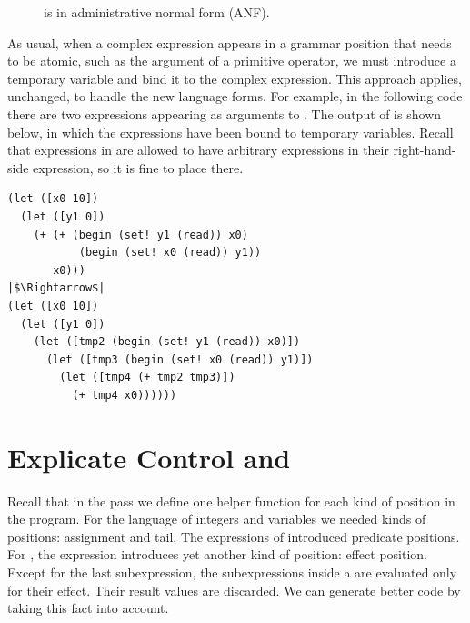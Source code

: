 \documentclass[11pt]{book}
\newcommand{\gray}[1]{{\color{gray} #1}}
\begin{document}
\begin{figure}[tp]
\centering
\fbox{
\begin{minipage}{0.96\textwidth}
\small
\[
\begin{array}{rcl}
\Atm &::=& \gray{ \INT{\Int} \mid \VAR{\Var} \mid \BOOL{\itm{bool}}
       \mid \VOID{} } \\
\Exp &::=& \ldots \mid \gray{ \LET{\Var}{\Exp}{\Exp} } \\
    &\mid& \WHILE{\Exp}{\Exp} \mid \SETBANG{\Var}{\Exp}
   \mid \BEGIN{\LP\Exp\ldots\RP}{\Exp} \\
\Def &::=& \gray{ \FUNDEF{\Var}{([\Var \code{:} \Type]\ldots)}{\Type}{\code{'()}}{\Exp} }\\
R^{\dagger}_8  &::=& \gray{ \PROGRAMDEFS{\code{'()}}{\Def} }
\end{array}
\]
\end{minipage}
}
\caption{\LangLoopANF{} is \LangLoop{} in administrative normal form (ANF).}
\label{fig:Rwhile-anf-syntax}
\end{figure}

As usual, when a complex expression appears in a grammar position that
needs to be atomic, such as the argument of a primitive operator, we
must introduce a temporary variable and bind it to the complex
expression.  This approach applies, unchanged, to handle the new
language forms.  For example, in the following code there are two
 expressions appearing as arguments to \code{+}.  The
output of  is shown below, in which the 
expressions have been bound to temporary variables. Recall that
 expressions in \LangLoopANF{} are allowed to have
arbitrary expressions in their right-hand-side expression, so it is
fine to place  there.

\begin{lstlisting}
(let ([x0 10])
  (let ([y1 0])
    (+ (+ (begin (set! y1 (read)) x0)
           (begin (set! x0 (read)) y1))
       x0)))
|$\Rightarrow$|
(let ([x0 10])
  (let ([y1 0])
    (let ([tmp2 (begin (set! y1 (read)) x0)])
      (let ([tmp3 (begin (set! x0 (read)) y1)])
        (let ([tmp4 (+ tmp2 tmp3)])
          (+ tmp4 x0))))))
\end{lstlisting}

\section{Explicate Control and \LangCLoop{}}
\label{sec:explicate-loop}

Recall that in the  pass we define one helper
function for each kind of position in the program.  For the \LangVar{}
language of integers and variables we needed kinds of positions:
assignment and tail. The  expressions of \LangIf{} introduced
predicate positions. For \LangLoop{}, the  expression introduces
yet another kind of position: effect position. Except for the last
subexpression, the subexpressions inside a  are evaluated
only for their effect. Their result values are discarded. We can
generate better code by taking this fact into account.
\end{document}
